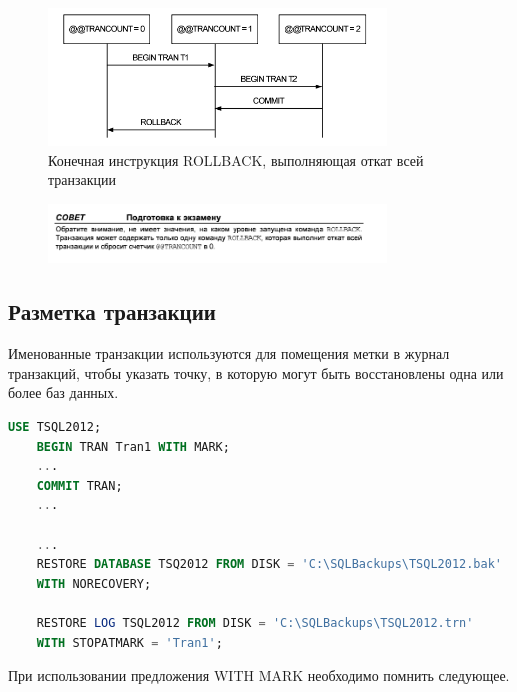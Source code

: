 \begin{figure}[h!]
	\begin{center}
		\includegraphics[width=0.8\textwidth]{img/t5.png}
	\end{center}
	\caption{Конечная инструкция ROLLBACK, выполняющая откат всей транзакции}
	\captionsetup{justification=centering}
\end{figure}

\begin{figure}[h!]
	\begin{center}
		\includegraphics[width=0.8\textwidth]{img/advice26.png}
	\end{center}
	\captionsetup{justification=centering}
\end{figure}

\subsection{Разметка транзакции}

Именованные транзакции используются для помещения метки в журнал транзакций, чтобы указать точку, в которую могут быть восстановлены одна или более баз
данных.


\begin{lstlisting}[label=lst:funcReturn, language=sql]
	USE TSQL2012;
	BEGIN TRAN Tran1 WITH MARK;
	...
	COMMIT TRAN;
	...

	...
	RESTORE DATABASE TSQ2012 FROM DISK = 'C:\SQLBackups\TSQL2012.bak'
 	WITH NORECOVERY;

	RESTORE LOG TSQL2012 FROM DISK = 'C:\SQLBackups\TSQL2012.trn'
 	WITH STOPATMARK = 'Tran1';
\end{lstlisting}

При использовании предложения WITH MARK необходимо помнить следующее. 


